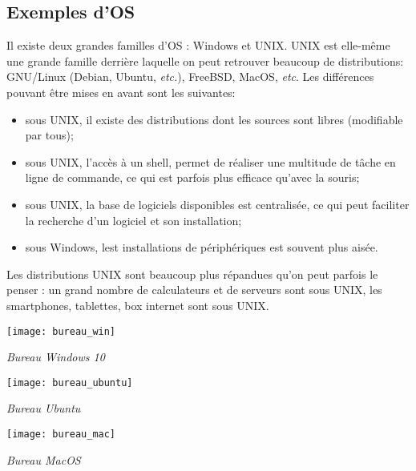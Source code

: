 \subsection{Exemples d'OS}
Il existe deux grandes familles d'OS : Windows et UNIX. UNIX est elle-même une grande famille derrière laquelle on peut retrouver beaucoup de distributions:  GNU/Linux (Debian, Ubuntu, \textit{etc.}), FreeBSD, MacOS, \textit{etc}. Les différences pouvant être mises en avant sont les suivantes:
\begin{itemize}
\item sous UNIX, il existe des distributions dont les sources sont libres (modifiable par tous);
\item sous UNIX, l'accès à un shell, permet de réaliser une multitude de tâche en ligne de commande, ce qui est parfois plus efficace qu'avec la souris;
\item sous UNIX, la base de logiciels disponibles est centralisée, ce qui peut faciliter la recherche d'un logiciel et son installation;
\item sous Windows, lest installations de périphériques est souvent plus aisée. 
\end{itemize}

Les distributions UNIX sont beaucoup plus répandues qu'on peut parfois le penser : un grand nombre de calculateurs et de serveurs sont sous UNIX, les smartphones, tablettes, box internet sont sous UNIX.



\begin{minipage}[c]{.3\linewidth}
\begin{center}
\texttt{[image: bureau\_win]}

\textit{Bureau Windows 10}
\end{center}
\end{minipage} \hfill
\begin{minipage}[c]{.3\linewidth}
\begin{center}
\texttt{[image: bureau\_ubuntu]}

\textit{Bureau Ubuntu}
\end{center}
\end{minipage} \hfill
\begin{minipage}[c]{.3\linewidth}
\begin{center}
\texttt{[image: bureau\_mac]}

\textit{Bureau MacOS}
\end{center}
\end{minipage} 

